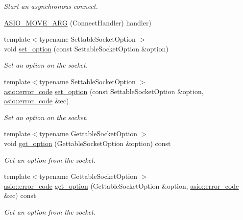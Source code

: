 \begin{DoxyCompactItemize}
\begin{DoxyCompactList}\small\item\em Start an asynchronous connect. \end{DoxyCompactList}\item 
\hyperlink{classasio_1_1basic__socket_a2b827d825c0ef2d3f6917398d8e78989}{A\+S\+I\+O\+\_\+\+M\+O\+V\+E\+\_\+\+A\+R\+G} (Connect\+Handler) handler)
\item 
{\footnotesize template$<$typename Settable\+Socket\+Option $>$ }\\void \hyperlink{classasio_1_1basic__socket_a776164e8dc9f0156206d1459c950b68d}{set\+\_\+option} (const Settable\+Socket\+Option \&option)
\begin{DoxyCompactList}\small\item\em Set an option on the socket. \end{DoxyCompactList}\item 
{\footnotesize template$<$typename Settable\+Socket\+Option $>$ }\\\hyperlink{classasio_1_1error__code}{asio\+::error\+\_\+code} \hyperlink{classasio_1_1basic__socket_a284772800864f2f2a3d209993521ef11}{set\+\_\+option} (const Settable\+Socket\+Option \&option, \hyperlink{classasio_1_1error__code}{asio\+::error\+\_\+code} \&ec)
\begin{DoxyCompactList}\small\item\em Set an option on the socket. \end{DoxyCompactList}\item 
{\footnotesize template$<$typename Gettable\+Socket\+Option $>$ }\\void \hyperlink{classasio_1_1basic__socket_a72acbfd8e025ceaf45cc4bcbeed7ac2a}{get\+\_\+option} (Gettable\+Socket\+Option \&option) const 
\begin{DoxyCompactList}\small\item\em Get an option from the socket. \end{DoxyCompactList}\item 
{\footnotesize template$<$typename Gettable\+Socket\+Option $>$ }\\\hyperlink{classasio_1_1error__code}{asio\+::error\+\_\+code} \hyperlink{classasio_1_1basic__socket_a14d53c10dd2440284a92057d4ee847e3}{get\+\_\+option} (Gettable\+Socket\+Option \&option, \hyperlink{classasio_1_1error__code}{asio\+::error\+\_\+code} \&ec) const 
\begin{DoxyCompactList}\small\item\em Get an option from the socket. \end{DoxyCompactList}\item 

\end{DoxyCompactItemize}
